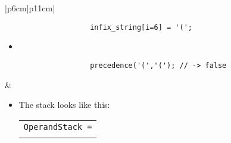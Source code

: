 \begin{center}
\begin{longtable}{ |p{6cm}|p{11cm}| }
        \hline
        \hline
             \\
        
        \hline
        \hline
            {
                \begin{verbatim}
                    infix_string[i=6] = '(';
                \end{verbatim}
            }
            \begin{itemize}
                \item 
            \end{itemize}
            {
                \begin{verbatim}
                    precedence('(','('); // -> false
                \end{verbatim}
            }
            &  
            \begin{itemize}
                \item The stack looks like this: 
                    {
                    \begin{center}
                        \begin{tabular}{ c }
                            \texttt{OperandStack =} \\ \\
                        \end{tabular}
                        \begin{bytefield}{10}
                             \\
                        \end{bytefield}
                    \end{center}
                    }
                

\end{itemize}
\end{longtable}
\end{center}
